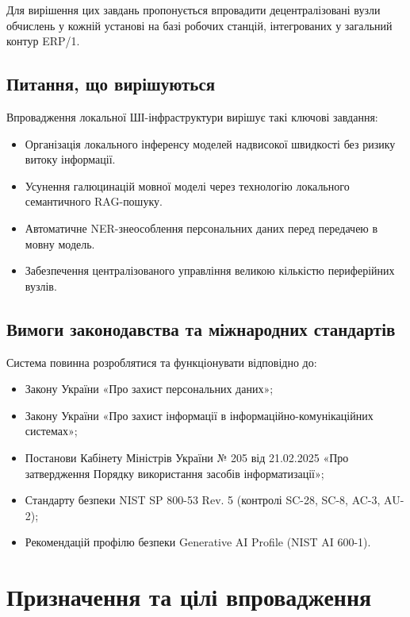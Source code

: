 \documentclass{article}
\begin{document}
Для вирішення цих завдань пропонується впровадити децентралізовані вузли обчислень у кожній установі
на базі робочих станцій, інтегрованих у загальний контур ERP/1.

\subsection{Питання, що вирішуються}

Впровадження локальної ШІ-інфраструктури вирішує такі ключові завдання:

\begin{itemize}
    \item Організація локального інференсу моделей надвисокої швидкості без ризику витоку інформації.
    \item Усунення галюцинацій мовної моделі через технологію локального семантичного RAG-пошуку.
    \item Автоматичне NER-знеособлення персональних даних перед передачею в мовну модель.
    \item Забезпечення централізованого управління великою кількістю периферійних вузлів.
\end{itemize}

\subsection{Вимоги законодавства та міжнародних стандартів}

Система повинна розроблятися та функціонувати відповідно до:

\begin{itemize}
    \item Закону України «Про захист персональних даних»;
    \item Закону України «Про захист інформації в інформаційно-комунікаційних системах»;
    \item Постанови Кабінету Міністрів України № 205 від 21.02.2025 «Про затвердження Порядку використання засобів інформатизації»;
    \item Стандарту безпеки NIST SP 800-53 Rev. 5 (контролі SC-28, SC-8, AC-3, AU-2);
    \item Рекомендацій профілю безпеки Generative AI Profile (NIST AI 600-1).
\end{itemize}

\section{Призначення та цілі впровадження}
\end{document}
